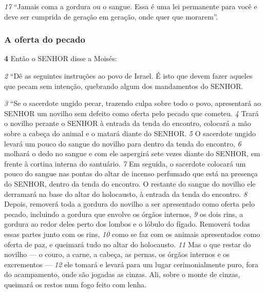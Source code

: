\smallskip
\textit{\tiny 17}
“Jamais coma a gordura ou o sangue. Essa é uma lei permanente para você e
deve ser cumprida de geração em geração, onde quer que morarem”.
  
\bigskip
\subsubsection*{A oferta do pecado}
\textbf{\large 4} Então o SENHOR disse a Moisés: 

\smallskip
\textit{\tiny 2} 
“Dê as seguintes instruções ao povo de Israel.
É isto que devem fazer aqueles que pecam sem intenção, quebrando algum dos
mandamentos do SENHOR. 

\smallskip
\textit{\tiny 3} 
“Se o sacerdote ungido pecar, trazendo culpa sobre todo o povo, apresentará
ao SENHOR um novilho sem defeito como oferta pelo pecado que cometeu. 
\textit{\tiny 4} 
Trará
o novilho perante o SENHOR à entrada da tenda do encontro, colocará a mão sobre
a cabeça do animal e o matará diante do SENHOR. 
\textit{\tiny 5} 
O sacerdote ungido levará um
pouco do sangue do novilho para dentro da tenda do encontro, 
\textit{\tiny 6} 
molhará o dedo
no sangue e com ele aspergirá sete vezes diante do SENHOR, em frente à cortina
interna do santuário. 
\textit{\tiny 7} 
Em seguida, o sacerdote colocará um pouco do sangue nas
pontas do altar de incenso perfumado que está na presença do SENHOR, dentro da
tenda do encontro. O restante do sangue do novilho ele derramará na base do
altar do holocausto, à entrada da tenda do encontro. 
\textit{\tiny 8} 
Depois, removerá toda a
gordura do novilho a ser apresentado como oferta pelo pecado, incluindo a
gordura que envolve os órgãos internos, 
\textit{\tiny 9} 
os dois rins, a gordura ao redor deles
perto dos lombos e o lóbulo do fígado. Removerá todas essas partes junto com os
rins, 
\textit{\tiny 10}
como se faz com os animais apresentados como oferta de paz, e queimará
tudo no altar do holocausto. 
\textit{\tiny 11}
Mas o que restar do novilho — o couro, a carne, a
cabeça, as pernas, os órgãos internos e os excrementos — 
\textit{\tiny 12}
ele tomará e levará
para um lugar cerimonialmente puro, fora do acampamento, onde são jogadas as
cinzas. Ali, sobre o monte de cinzas, queimará os restos num fogo feito com
lenha.
   

